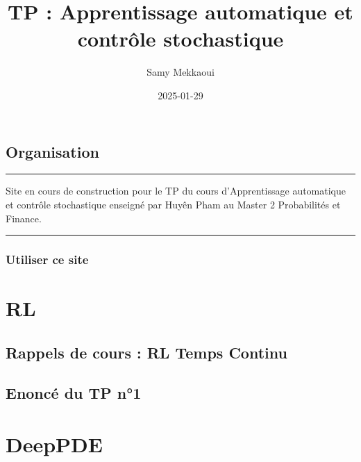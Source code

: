 \documentclass[
  10,
  letterpaper,
  DIV=11,
  numbers=noendperiod]{scrreport}
\title{TP : Apprentissage automatique et contrôle stochastique}
\author{Samy Mekkaoui}
\date{2025-01-29}
\renewcommand*\contentsname{Table des matières}
\newcommand\contentsname{Table des matières}
\theoremstyle{definition}
\theoremstyle{remark}
\begin{document}
\maketitle

\renewcommand*\contentsname{Table des matières}
{
\hypersetup{linkcolor=}
\setcounter{tocdepth}{2}
\tableofcontents
}


\chapter*{Organisation}\label{organisation}


\begin{center}\rule{0.5\linewidth}{0.5pt}\end{center}

Site en cours de construction pour le TP du cours d'Apprentissage
automatique et contrôle stochastique enseigné par Huyên Pham au Master 2
Probabilités et Finance.

\begin{center}\rule{0.5\linewidth}{0.5pt}\end{center}

\section*{Utiliser ce site}\label{utiliser-ce-site}


\part{RL}

\chapter{Rappels de cours : RL Temps
Continu}\label{rappels-de-cours-rl-temps-continu}

\chapter{Enoncé du TP n°1}\label{enoncuxe9-du-tp-n1}

\part{DeepPDE}
\end{document}
